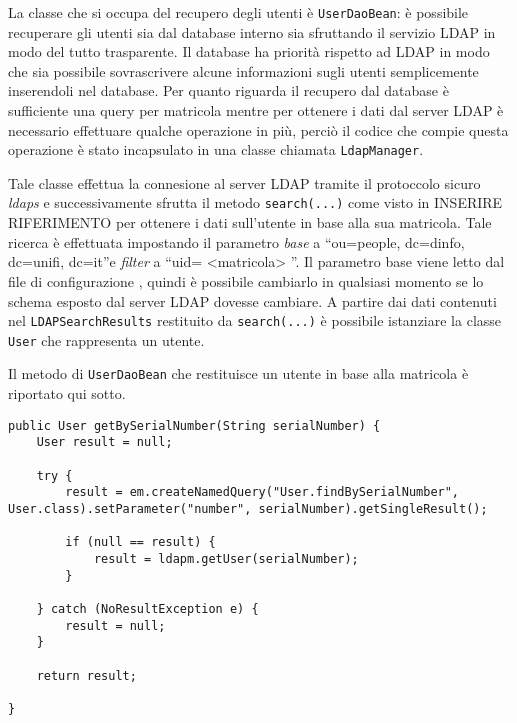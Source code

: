 La classe che si occupa del recupero degli utenti è \texttt{UserDaoBean}: è possibile recuperare gli utenti sia dal database interno sia sfruttando il servizio LDAP in modo del tutto trasparente.
Il database ha priorità rispetto ad LDAP in modo che sia possibile sovrascrivere alcune informazioni sugli utenti semplicemente inserendoli nel database. Per quanto riguarda il recupero dal database è sufficiente una query per matricola 
mentre per ottenere i dati dal server LDAP è necessario effettuare qualche operazione in più, perciò il codice che compie questa operazione è stato incapsulato in una classe chiamata \texttt{LdapManager}.

Tale classe effettua la connesione al server LDAP tramite il protoccolo sicuro \textsl{ldaps} e successivamente sfrutta il metodo \texttt{search(...)} come visto in INSERIRE RIFERIMENTO per ottenere i dati sull'utente in base alla sua matricola.
Tale ricerca è effettuata impostando il parametro \textsl{base} a ``ou=people, dc=dinfo, dc=unifi, dc=it''e \textsl{filter} a ``uid= <matricola> ''. Il parametro base viene letto dal file di configurazione 
, quindi è possibile cambiarlo in qualsiasi momento se lo schema esposto dal server LDAP dovesse cambiare.
A partire dai dati contenuti nel \texttt{LDAPSearchResults} restituito da \texttt{search(...)} è possibile istanziare la classe \texttt{User} che rappresenta un utente.

Il metodo di \texttt{UserDaoBean} che restituisce un utente in base alla matricola è riportato qui sotto.

\begin{lstlisting}
public User getBySerialNumber(String serialNumber) {
	User result = null;
	
	try {
		result = em.createNamedQuery("User.findBySerialNumber", User.class).setParameter("number", serialNumber).getSingleResult();
		
		if (null == result) {
			result = ldapm.getUser(serialNumber);
		}
		
	} catch (NoResultException e) {
		result = null;
	}

	return result;

}
\end{lstlisting}



